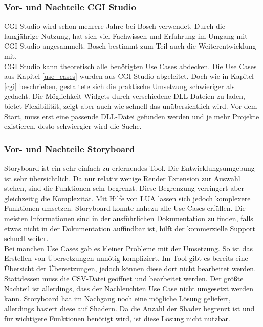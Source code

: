 \subsubsection{Vor- und Nachteile CGI Studio}
CGI Studio wird schon mehrere Jahre bei Bosch verwendet. Durch die langjährige Nutzung, hat sich viel Fachwissen und Erfahrung im Umgang mit CGI Studio angesammelt. Bosch bestimmt zum Teil auch die Weiterentwicklung mit.\\

CGI Studio kann theoretisch alle benötigten Use Cases abdecken. Die Use Cases aus Kapitel \ref{use_cases} wurden aus CGI Studio abgeleitet. Doch wie in Kapitel \ref{cgi} beschrieben, gestaltete sich die praktische Umsetzung schwieriger als gedacht. Die Möglichkeit Widgets durch verschiedene DLL-Dateien zu laden, bietet Flexibilität, zeigt aber auch wie schnell das unübersichtlich wird. Vor dem Start, muss erst eine passende DLL-Datei gefunden werden und je mehr Projekte existieren, desto schwiergier wird die Suche.\\


\subsubsection{Vor- und Nachteile Storyboard}
Storyboard ist ein sehr einfach zu erlernendes Tool. Die Entwicklungsumgebung ist sehr übersichtlich. Da nur relativ wenige Render Extension zur Auswahl stehen, sind die Funktionen sehr begrenzt. Diese Begrenzung verringert aber gleichzeitig die Komplexität. Mit Hilfe von LUA lassen sich jedoch komplexere Funktionen umsetzen. Storyboard konnte nahezu alle Use Cases erfüllen. Die meisten Informationen sind in der ausführlichen Dokumentation zu finden, falls etwas nicht in der Dokumentation auffindbar ist, hilft der kommerzielle Support schnell weiter. \\

Bei manchen Use Cases gab es kleiner Probleme mit der Umsetzung. So ist das Erstellen von Übersetzungen unnötig kompliziert. Im Tool gibt es bereits eine Übersicht der Übersetzungen, jedoch können diese dort nicht bearbeitet werden. Stattdessen muss die CSV-Datei geöffnet und bearbeitet werden. Der größte Nachteil ist allerdings, dass der Nachleuchten Use Case nicht umgesetzt werden kann. Storyboard hat im Nachgang noch eine mögliche Lösung geliefert, allerdings basiert diese auf Shadern. Da die Anzahl der Shader begrenzt ist und für wichtigere Funktionen benötigt wird, ist diese Lösung nicht nutzbar. \\


